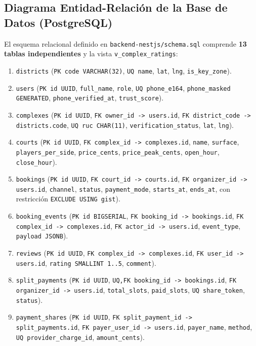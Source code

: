 \documentclass[10pt,a4paper]{article}
\begin{document}
\subsection{Diagrama Entidad-Relación de la Base de Datos (PostgreSQL)}

El esquema relacional definido en \texttt{backend-nestjs/schema.sql} comprende \textbf{13 tablas independientes} y la vista \texttt{v\_complex\_ratings}:
\begin{enumerate}
  \item \texttt{districts} (\texttt{PK code VARCHAR(32)}, \texttt{UQ name}, \texttt{lat}, \texttt{lng}, \texttt{is\_key\_zone}).
  \item \texttt{users} (\texttt{PK id UUID}, \texttt{full\_name}, \texttt{role}, \texttt{UQ phone\_e164}, \texttt{phone\_masked GENERATED}, \texttt{phone\_verified\_at}, \texttt{trust\_score}).
  \item \texttt{complexes} (\texttt{PK id UUID}, \texttt{FK owner\_id -> users.id}, \texttt{FK district\_code -> districts.code}, \texttt{UQ ruc CHAR(11)}, \texttt{verification\_status}, \texttt{lat}, \texttt{lng}).
  \item \texttt{courts} (\texttt{PK id UUID}, \texttt{FK complex\_id -> complexes.id}, \texttt{name}, \texttt{surface}, \texttt{players\_per\_side}, \texttt{price\_cents}, \texttt{price\_peak\_cents}, \texttt{open\_hour}, \texttt{close\_hour}).
  \item \texttt{bookings} (\texttt{PK id UUID}, \texttt{FK court\_id -> courts.id}, \texttt{FK organizer\_id -> users.id}, \texttt{channel}, \texttt{status}, \texttt{payment\_mode}, \texttt{starts\_at}, \texttt{ends\_at}, con restricción \texttt{EXCLUDE USING gist}).
  \item \texttt{booking\_events} (\texttt{PK id BIGSERIAL}, \texttt{FK booking\_id -> bookings.id}, \texttt{FK complex\_id -> complexes.id}, \texttt{FK actor\_id -> users.id}, \texttt{event\_type}, \texttt{payload JSONB}).
  \item \texttt{reviews} (\texttt{PK id UUID}, \texttt{FK complex\_id -> complexes.id}, \texttt{FK user\_id -> users.id}, \texttt{rating SMALLINT 1..5}, \texttt{comment}).
  \item \texttt{split\_payments} (\texttt{PK id UUID}, \texttt{UQ,FK booking\_id -> bookings.id}, \texttt{FK organizer\_id -> users.id}, \texttt{total\_slots}, \texttt{paid\_slots}, \texttt{UQ share\_token}, \texttt{status}).
  \item \texttt{payment\_shares} (\texttt{PK id UUID}, \texttt{FK split\_payment\_id -> split\_payments.id}, \texttt{FK payer\_user\_id -> users.id}, \texttt{payer\_name}, \texttt{method}, \texttt{UQ provider\_charge\_id}, \texttt{amount\_cents}).

\end{enumerate}
\end{document}

